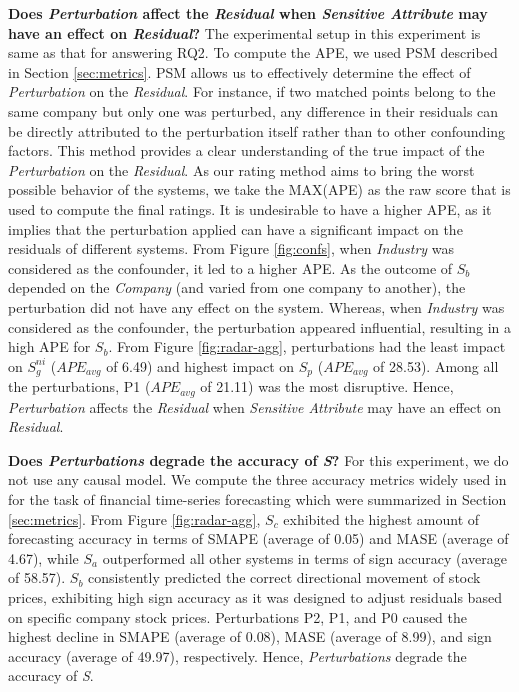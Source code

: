 {\color{blue}} \textbf{Does \emph{Perturbation} affect the \emph{Residual} when \emph{Sensitive Attribute} may have an effect on \emph{Residual}?}
The experimental setup in this experiment is same as that for answering RQ2. To compute the APE, we used PSM described in Section \ref{sec:metrics}. PSM allows us to effectively determine the effect of \emph{Perturbation} on the \emph{Residual}. For instance, if two matched points belong to the same company but only one was perturbed, any difference in their residuals can be directly attributed to the perturbation itself rather than to other confounding factors. This method provides a clear understanding of the true impact of the \emph{Perturbation} on the \emph{Residual}. As our rating method aims to bring the worst possible behavior of the systems, we take the MAX(APE) as the raw score that is used to compute the final ratings. 
 It is undesirable to have a higher APE, as it implies that the perturbation applied can have a significant impact on the residuals of different systems. From Figure \ref{fig:confs}, when \textit{Industry} was considered as the confounder, it led to a higher APE. As the outcome of $S_b$ depended on the \textit{Company} (and varied from one company to another), the perturbation did not have any effect on the system. Whereas, when \textit{Industry} was considered as the confounder, the perturbation appeared influential, resulting in a high APE for $S_b$. From Figure \ref{fig:radar-agg}, perturbations had the least impact on $S_g^{ni}$ ($APE_{avg}$ of 6.49) and highest impact on $S_p$ ($APE_{avg}$ of 28.53). Among all the perturbations, P1 ($APE_{avg}$ of 21.11) was the most disruptive. Hence, \emph{Perturbation} affects the \emph{Residual} when \emph{Sensitive Attribute} may have an effect on \emph{Residual}.

{\color{blue}} \textbf{Does \emph{Perturbations} degrade the accuracy of \emph{S}?}
 For this experiment, we do not use any causal model. We compute the three accuracy metrics widely used in for the task of financial time-series forecasting \cite{makridakis2022m5} which were summarized in Section \ref{sec:metrics}. 
  From Figure \ref{fig:radar-agg}, $S_c$ exhibited the highest amount of forecasting accuracy in terms of SMAPE (average of 0.05) and MASE (average of 4.67), while $S_a$ outperformed all other systems in terms of sign accuracy (average of 58.57). $S_b$ consistently predicted the correct directional movement of stock prices, exhibiting high sign accuracy as it was designed to adjust residuals based on specific company stock prices. Perturbations P2, P1, and P0 caused the highest decline in SMAPE (average of 0.08), MASE (average of 8.99), and sign accuracy (average of 49.97), respectively. 
Hence, \emph{Perturbations} degrade the accuracy of \emph{S}.

